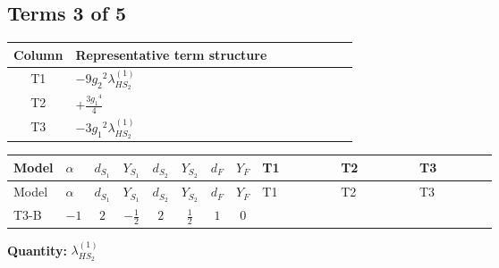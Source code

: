 \documentclass[8pt]{article}
\begin{document}
\begin{landscape}
\subsection*{Terms 3 of 5}
\begin{center}
\begin{tabular}{@{}c >{\raggedright\arraybackslash}p{0.82\linewidth}@{}}
\toprule
Column & Representative term structure \\
\midrule
T1 & \(\displaystyle -9 {g_2}^2 {\lambda_{HS_2}^{(1)}}\) \\
\midrule
T2 & \(\displaystyle +\frac{3 {g_1}^4}{4}\) \\
\midrule
T3 & \(\displaystyle -3 {g_1}^2 {\lambda_{HS_2}^{(1)}}\) \\
\midrule
\bottomrule
\end{tabular}
\end{center}
\smallskip
\tiny
\begin{longtable}{@{}llcccccc >{\raggedright\arraybackslash}p{0.21\linewidth} >{\raggedright\arraybackslash}p{0.21\linewidth} >{\raggedright\arraybackslash}p{0.21\linewidth}@{}}
\toprule
Model & $\alpha$ & $d_{S_1}$ & $Y_{S_1}$ & $d_{S_2}$ & $Y_{S_2}$ & $d_F$ & $Y_F$ & T1 & T2 & T3 \\
\midrule
\endfirsthead
\toprule
Model & $\alpha$ & $d_{S_1}$ & $Y_{S_1}$ & $d_{S_2}$ & $Y_{S_2}$ & $d_F$ & $Y_F$ & T1 & T2 & T3 \\
\midrule
\endhead
T3-B & $-1$ & $2$ & $-\frac{1}{2}$ & $2$ & $\frac{1}{2}$ & $1$ & $0$ & \scriptsize\adjustbox{max width=\linewidth}{$\begin{gathered} -9 {g_2}^2 {\lambda_{HS_2}^{(1)}}\end{gathered}$} & \scriptsize\adjustbox{max width=\linewidth}{$\begin{gathered} +\frac{3 {g_1}^4}{4}\end{gathered}$} & \scriptsize\adjustbox{max width=\linewidth}{$\begin{gathered} -3 {g_1}^2 {\lambda_{HS_2}^{(1)}}\end{gathered}$} \\
\midrule
\bottomrule
\end{longtable}
\clearpage
\noindent\textbf{Quantity: }$\lambda_{HS_2}^{(1)}$\par\smallskip

\end{landscape}
\end{document}
